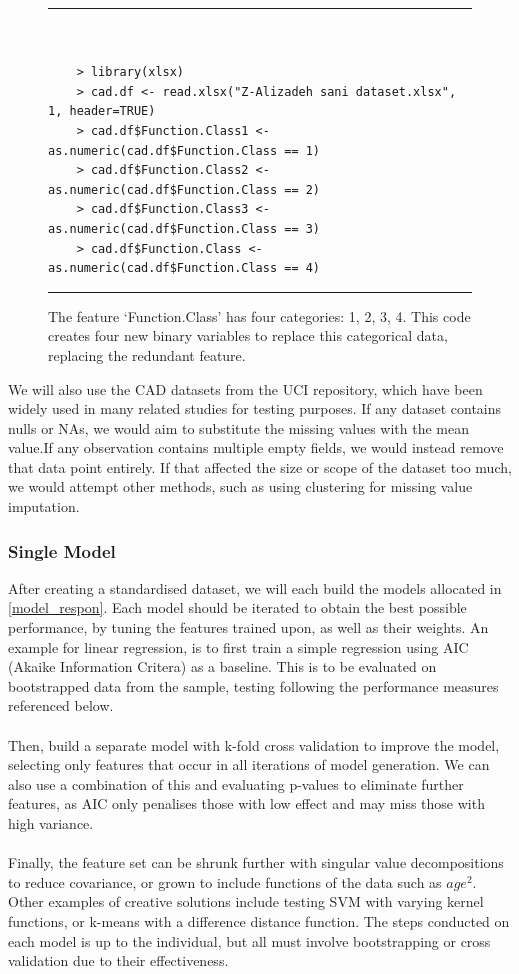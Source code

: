 \documentclass[a4paper, 12pt]{article}
\begin{document}
        \begin{figure}[h]
        \hrule %
        \begin{verbatim}
        
        
    > library(xlsx)
    > cad.df <- read.xlsx("Z-Alizadeh sani dataset.xlsx", 1, header=TRUE)
    > cad.df$Function.Class1 <- as.numeric(cad.df$Function.Class == 1)
    > cad.df$Function.Class2 <- as.numeric(cad.df$Function.Class == 2)
    > cad.df$Function.Class3 <- as.numeric(cad.df$Function.Class == 3)
    > cad.df$Function.Class <- as.numeric(cad.df$Function.Class == 4)
        \end{verbatim}
        \hrule
        \caption{The feature `Function.Class' has four categories: 1, 2, 3, 4. This code creates four new binary variables to replace this categorical data, replacing the redundant feature.}
        \end{figure}
        
        We will also use the CAD datasets from the UCI repository, which have been widely used in many related studies for testing purposes. If any dataset contains nulls or NAs, we would aim to substitute the missing values with the mean value.If any observation contains multiple empty fields, we would instead remove that data point entirely. If that affected the size or scope of the dataset too much, we would attempt other methods, such as using clustering for missing value imputation. 
        
        \subsubsection{Single Model}
        After creating a standardised dataset, we will each build the models allocated in \ref{model_respon}. Each model should be iterated to obtain the best possible performance, by tuning the features trained upon, as well as their weights. An example for linear regression, is to first train a simple regression using AIC (Akaike Information Critera) as a baseline. This is to be evaluated on bootstrapped data from the sample, testing following the performance measures referenced below.
        \\\\
        Then, build a separate model with k-fold cross validation to improve the model, selecting only features that occur in all iterations of model generation. We can also use a combination of this and evaluating p-values to eliminate further features, as AIC only penalises those with low effect and may miss those with high variance.
        \\\\
        Finally, the feature set can be shrunk further with singular value decompositions to reduce covariance, or grown to include functions of the data such as $age^2$. Other examples of creative solutions include testing SVM with varying kernel functions, or k-means with a difference distance function. The steps conducted on each model is up to the individual, but all must involve bootstrapping or cross validation due to their effectiveness. 
\end{document}
